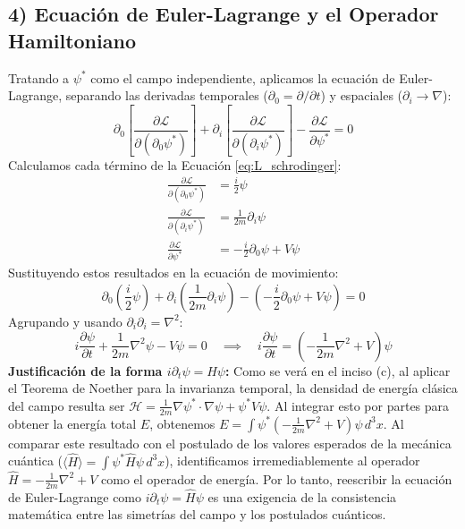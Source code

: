 \subsection*{4) Ecuación de Euler-Lagrange y el Operador Hamiltoniano}
Tratando a $\psi^*$ como el campo independiente, aplicamos la ecuación de Euler-Lagrange, separando las derivadas temporales ($\partial_0 = \partial/\partial t$) y espaciales ($\partial_i \to \nabla$):
\begin{equation}
    \partial_0 \left[ \frac{\partial \mathcal{L}}{\partial(\partial_0\psi^*)} \right] + \partial_i \left[ \frac{\partial \mathcal{L}}{\partial(\partial_i\psi^*)} \right] - \frac{\partial \mathcal{L}}{\partial\psi^*} = 0
\end{equation}
Calculamos cada término de la Ecuación \eqref{eq:L_schrodinger}:
\begin{align}
    \frac{\partial \mathcal{L}}{\partial(\partial_0\psi^*)} &= \frac{i}{2}\psi \\
    \frac{\partial \mathcal{L}}{\partial(\partial_i\psi^*)} &= \frac{1}{2m}\partial_i\psi \\
    \frac{\partial \mathcal{L}}{\partial\psi^*} &= -\frac{i}{2}\partial_0\psi + V\psi
\end{align}
Sustituyendo estos resultados en la ecuación de movimiento:
\begin{equation}
    \partial_0 \left( \frac{i}{2}\psi \right) + \partial_i \left( \frac{1}{2m}\partial_i\psi \right) - \left( -\frac{i}{2}\partial_0\psi + V\psi \right) = 0
\end{equation}
Agrupando y usando $\partial_i\partial_i = \nabla^2$:
\begin{equation}
    i\frac{\partial \psi}{\partial t} + \frac{1}{2m}\nabla^2\psi - V\psi = 0 \quad \implies \quad i\frac{\partial \psi}{\partial t} = \left(-\frac{1}{2m}\nabla^2 + V\right)\psi
\end{equation}
\textbf{Justificación de la forma $i\partial_t \psi = \hat{H} \psi$:} 
Como se verá en el inciso (c), al aplicar el Teorema de Noether para la invarianza temporal, la densidad de energía clásica del campo resulta ser $\mathcal{H} = \frac{1}{2m} \nabla\psi^* \cdot \nabla\psi + \psi^* V \psi$. Al integrar esto por partes para obtener la energía total $E$, obtenemos $E = \int \psi^* \left(-\frac{1}{2m}\nabla^2 + V\right) \psi \, d^3x$. Al comparar este resultado con el postulado de los valores esperados de la mecánica cuántica ($\langle \hat{H} \rangle = \int \psi^* \hat{H} \psi \, d^3x$), identificamos irremediablemente al operador $\hat{H} = -\frac{1}{2m}\nabla^2 + V$ como el operador de energía. Por lo tanto, reescribir la ecuación de Euler-Lagrange como $i\partial_t \psi = \hat{H} \psi$ es una exigencia de la consistencia matemática entre las simetrías del campo y los postulados cuánticos.



